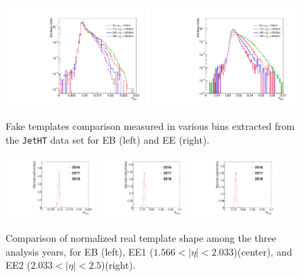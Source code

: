 \begin{figure}[!htbp]
\caption{Fake templates comparison measured in various \pt bins extracted from the \texttt{JetHT} data set for EB (left) and EE (right).}
\centering
\includegraphics[width=0.49\textwidth]{fig/faketemplatecompEB_jetht_2018.pdf}
\includegraphics[width=0.49\textwidth]{fig/faketemplatecompEE_jetht_2018.pdf}
\label{fig:fake_templates}
\end{figure}

\begin{figure}[!htbp]
\caption{Comparison of normalized real template shape among the three analysis years, for EB (left), EE1 ($1.566 < |\eta| < 2.033$)(center), and EE2 ($2.033 < \lvert \eta \rvert< 2.5$)(right).}
\centering
\includegraphics[width=0.3\textwidth]{fig/sieie_comparison_EB_diphoton_fake_rate_real_templates_all_GGJets_GJets_pt130To150_chIso5To10.pdf}
\includegraphics[width=0.3\textwidth]{fig/sieie_comparison_EE1_diphoton_fake_rate_real_templates_all_GGJets_GJets_pt130To150_chIso5To10.pdf}
\includegraphics[width=0.3\textwidth]{fig/sieie_comparison_EE2_diphoton_fake_rate_real_templates_all_GGJets_GJets_pt130To150_chIso5To10.pdf}
\label{fig:real_templates_by_year}
\end{figure}


